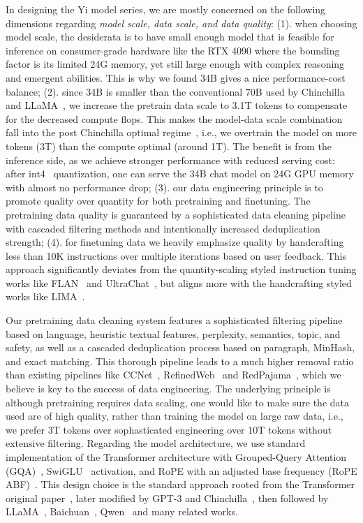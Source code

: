 \documentclass[numbers,sort&compress]{article}
\begin{document}
In designing the Yi model series, we are mostly concerned on the following dimensions regarding
\textit{model scale, data scale, and data quality}:
(1). when choosing model scale, the desiderata is to have small enough model that is feasible for inference on consumer-grade hardware like the RTX 4090 where the bounding factor is its limited 24G memory, yet still large enough with complex reasoning and emergent abilities. This is why we found 34B gives a nice performance-cost balance;
(2). since 34B is smaller than the conventional 70B used by Chinchilla~\citep{hoffmann2022training} and LLaMA~\citep{llama2}, we increase the pretrain data scale to 3.1T tokens to compensate for the decreased compute flops. This makes the model-data scale combination fall into the post Chinchilla optimal regime~\citep{sardana2023beyond}, i.e., we overtrain the model on more tokens (3T) than the compute optimal (around 1T). The benefit is from the inference side, as we achieve stronger performance with reduced serving cost: after int4~\citep{wu2023understanding} quantization, one can serve the 34B chat model on 24G GPU memory with almost no performance drop;
(3). our data engineering principle is to promote quality over quantity for both pretraining and finetuning.
The pretraining data quality is guaranteed by a sophisticated data cleaning pipeline with cascaded filtering methods and intentionally increased deduplication strength;
(4). for finetuning data we heavily emphasize quality by handcrafting less than 10K instructions over multiple iterations based on user feedback. This approach significantly deviates from the quantity-scaling styled instruction tuning works like FLAN~\citep{chung2022scaling} and UltraChat~\citep{ding2023enhancing}, but aligns more with the handcrafting styled works like LIMA~\citep{zhou2023lima}.

Our pretraining data cleaning system features a sophisticated filtering pipeline based on language, heuristic textual features, perplexity, semantics, topic, and safety, as well as a cascaded deduplication process based on paragraph, MinHash, and exact matching. 
This thorough pipeline leads to a much higher removal ratio than existing pipelines like CCNet~\citep{wenzek2019ccnet}, RefinedWeb~\citep{penedo2023refinedweb} and RedPajama~\citep{together2023redpajama}, which we believe is key to the success of data engineering.
The underlying principle is although pretraining requires data scaling, one would like to make sure the data used are of high quality, rather than training the model on large raw data, i.e.,  
we prefer 3T tokens over sophasticated engineering over 10T tokens without extensive filtering. 
Regarding the model architecture, we use standard implementation of the Transformer architecture with Grouped-Query Attention (GQA)~\citep{gqa}, SwiGLU~\citep{swiglu} activation, and RoPE with an adjusted base frequency (RoPE ABF)~\citep{xiong2023effective}.
This design choice is the standard approach rooted from the Transformer original paper~\citep{Vaswani:2017aa}, later modified by GPT-3 and Chinchilla~\citep{hoffmann2022training}, then followed by LLaMA~\citep{llama2}, Baichuan~\citep{Yang:2023aa}, Qwen~\citep{Bai:2023aa} and many related works. 
\end{document}

